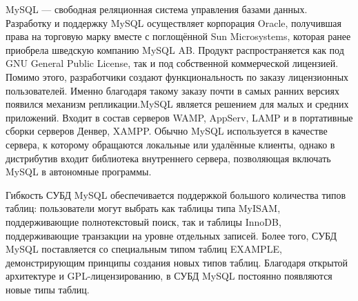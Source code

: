 MySQL — свободная реляционная система управления базами данных. Разработку и поддержку MySQL осуществляет корпорация Oracle, получившая права на торговую марку вместе с поглощённой Sun Microsystems, которая ранее приобрела шведскую компанию MySQL AB. Продукт распространяется как под GNU General Public License, так и под собственной коммерческой лицензией. Помимо этого, разработчики создают функциональность по заказу лицензионных пользователей. Именно благодаря такому заказу почти в самых ранних версиях появился механизм репликации.MySQL является решением для малых и средних приложений. Входит в состав серверов WAMP, AppServ, LAMP и в портативные сборки серверов Денвер, XAMPP. Обычно MySQL используется в качестве сервера, к которому обращаются локальные или удалённые клиенты, однако в дистрибутив входит библиотека внутреннего сервера, позволяющая включать MySQL в автономные программы.

Гибкость СУБД MySQL обеспечивается поддержкой большого количества типов таблиц: пользователи могут выбрать как таблицы типа MyISAM, поддерживающие полнотекстовый поиск, так и таблицы InnoDB, поддерживающие транзакции на уровне отдельных записей. Более того, СУБД MySQL поставляется со специальным типом таблиц EXAMPLE, демонстрирующим принципы создания новых типов таблиц. Благодаря открытой архитектуре и GPL-лицензированию, в СУБД MySQL постоянно появляются новые типы таблиц.

\newpage
